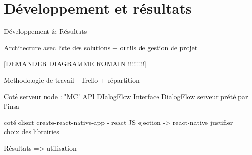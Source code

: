 \chapter{Développement et résultats}

Développement \& Résultats

Architecture avec liste des solutions + outils de gestion de projet

[DEMANDER DIAGRAMME ROMAIN !!!!!!!!!]

Methodologie de travail - Trello + répartition

Coté serveur 
    node : "MC"
    API DIalogFlow
    Interface DialogFlow 
    serveur prété par l'insa 

coté client 
    create-react-native-app - react JS 
    ejection -> react-native 
    justifier choix des librairies 

Résultats => utilisation 
    